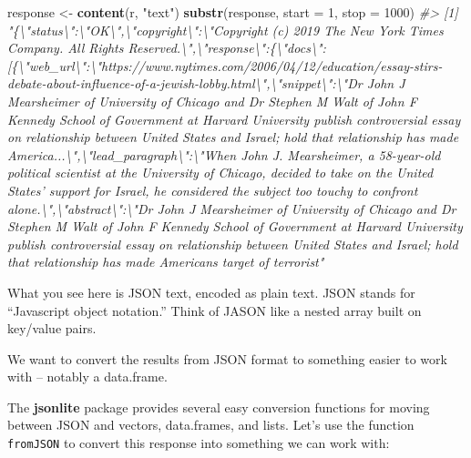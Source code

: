 \documentclass[]{book}
\newenvironment{Shaded}{\begin{snugshade}}{\end{snugshade}}
\newcommand{\CommentTok}[1]{\textcolor[rgb]{0.56,0.35,0.01}{\textit{#1}}}
\newcommand{\DataTypeTok}[1]{\textcolor[rgb]{0.13,0.29,0.53}{#1}}
\newcommand{\DecValTok}[1]{\textcolor[rgb]{0.00,0.00,0.81}{#1}}
\newcommand{\KeywordTok}[1]{\textcolor[rgb]{0.13,0.29,0.53}{\textbf{#1}}}
\newcommand{\NormalTok}[1]{#1}
\newcommand{\StringTok}[1]{\textcolor[rgb]{0.31,0.60,0.02}{#1}}
\begin{document}
\begin{Shaded}
\begin{Highlighting}[]
\NormalTok{response <-}\StringTok{ }\KeywordTok{content}\NormalTok{(r, }\StringTok{"text"}\NormalTok{)}
\KeywordTok{substr}\NormalTok{(response, }\DataTypeTok{start =} \DecValTok{1}\NormalTok{, }\DataTypeTok{stop =} \DecValTok{1000}\NormalTok{)}
\CommentTok{#> [1] "\{\textbackslash{}"status\textbackslash{}":\textbackslash{}"OK\textbackslash{}",\textbackslash{}"copyright\textbackslash{}":\textbackslash{}"Copyright (c) 2019 The New York Times Company. All Rights Reserved.\textbackslash{}",\textbackslash{}"response\textbackslash{}":\{\textbackslash{}"docs\textbackslash{}":[\{\textbackslash{}"web_url\textbackslash{}":\textbackslash{}"https://www.nytimes.com/2006/04/12/education/essay-stirs-debate-about-influence-of-a-jewish-lobby.html\textbackslash{}",\textbackslash{}"snippet\textbackslash{}":\textbackslash{}"Dr John J Mearsheimer of University of Chicago and Dr Stephen M Walt of John F Kennedy School of Government at Harvard University publish controversial essay on relationship between United States and Israel; hold that relationship has made America...\textbackslash{}",\textbackslash{}"lead_paragraph\textbackslash{}":\textbackslash{}"When John J. Mearsheimer, a 58-year-old political scientist at the University of Chicago, decided to take on the United States' support for Israel, he considered the subject too touchy to confront alone.\textbackslash{}",\textbackslash{}"abstract\textbackslash{}":\textbackslash{}"Dr John J Mearsheimer of University of Chicago and Dr Stephen M Walt of John F Kennedy School of Government at Harvard University publish controversial essay on relationship between United States and Israel; hold that relationship has made Americans target of terrorist"}
\end{Highlighting}
\end{Shaded}

What you see here is JSON text, encoded as plain text. JSON stands for ``Javascript object notation.'' Think of JASON like a nested array built on key/value pairs.

We want to convert the results from JSON format to something easier to work with -- notably a data.frame.

The \textbf{jsonlite} package provides several easy conversion functions for moving between JSON and vectors, data.frames, and lists. Let's use the function \texttt{fromJSON} to convert this response into something we can work with:
\end{document}
